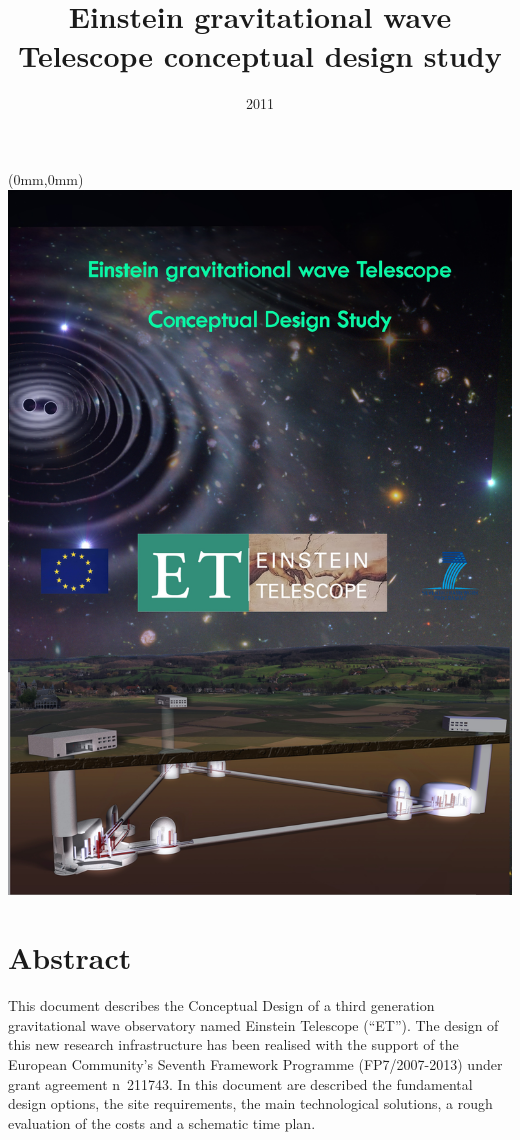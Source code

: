 \documentclass[draft,color,DIV12,pdftex,a4paper]{ET-DS}
\title{Einstein gravitational wave Telescope conceptual design study} \shorttitle{ET Design Study}
\date{2011}
\begin{document}
\begin{textblock*}{300mm}(0mm,0mm)   \includegraphics[width=\paperwidth]{Sec_Conclusions/FirstPagelatest4.jpg}
\end{textblock*}
%
%
\begin{titlepage}
\maketitle
\end{titlepage}
\clearpage
%
\FloatBarrier
%
\section*{Abstract}
This document describes the Conceptual Design of a third generation gravitational wave observatory named Einstein Telescope (``ET''). The design of this new research infrastructure has been realised with the support of the European Community's Seventh Framework
Programme (FP7/2007-2013) under grant agreement n~211743.  In this document are described the fundamental design options, the site requirements, the main technological solutions, a rough evaluation of the costs and a schematic time plan.
%
\vspace{1cm}
\end{document}
